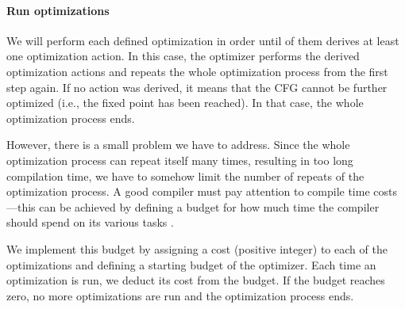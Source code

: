 \documentclass[thesis=M,english]{FITthesis}[2019/12/23]
\begin{document}
\paragraph*{Run optimizations} We will perform each defined optimization in order until of them derives at least one optimization action. In this case, the optimizer performs the derived optimization actions and repeats the whole optimization process from the first step again. If no action was derived, it means that the CFG cannot be further optimized (i.e., the fixed point has been reached). In that case, the whole optimization process ends.

However, there is a small problem we have to address. Since the whole optimization process can repeat itself many times, resulting in too long compilation time, we have to somehow limit the number of repeats of the optimization process. A good compiler must pay attention to compile time costs---this can be achieved by defining a budget for how much time the compiler should spend on its various tasks \cite[Chap. 1.3]{eng_comp}.

We implement this budget by assigning a cost (positive integer) to each of the optimizations and defining a starting budget of the optimizer. Each time an optimization is run, we deduct its cost from the budget. If the budget reaches zero, no more optimizations are run and the optimization process ends.
\end{document}
